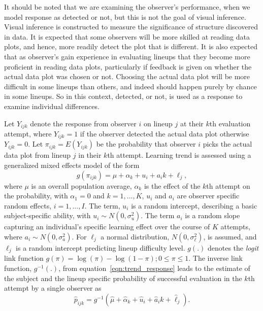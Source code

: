 \documentclass[10pt]{article}\usepackage[]{graphicx}\usepackage[]{color}
\begin{document}
It should be noted that we are examining the observer's performance, when we model response as detected or not, but this is not the goal of visual inference. Visual inference is constructed to measure the significance of structure discovered in data. It is expected that some observers will be more skilled at reading data plots, and hence, more readily detect the plot that is different. It is also expected that as observer's gain experience in evaluating lineups that they become more proficient in reading data plots, particularly if feedback is given on whether the actual data plot was chosen or not. Choosing the actual data plot will be more difficult in some lineups than others, and indeed should happen purely by chance in some lineups.%
So in this context, detected, or not, is used as a response to examine individual differences. 


Let $Y_{ijk}$ denote the response from observer $i$ on lineup $j$ at their $k$th evaluation attempt, where $Y_{ijk}=1$ if the observer detected the actual data plot otherwise  $Y_{ijk}=0$. Let $\pi_{ijk}=  E(Y_{ijk})$ be the probability that  observer $i$ picks the actual data plot from lineup $j$ in their $k$th attempt. Learning trend is assessed using a generalized mixed effects model of the form
\begin{equation} \label{eqn:trend_response}
g( \pi_{ijk} )= \mu + \alpha_k + u_i +  a_{i} k + \ell_j,  
\end{equation}
where $\mu$ is an overall population average, %
$\alpha_k$ is the effect of the $k$th attempt on the probability, with $\alpha_1 = 0$ and $k = 1, ..., K$, $u_i$ and $a_i$ are observer specific random effects, $i = 1, ..., I$. The term, $u_i$ is a random intercept, describing a basic subject-specific ability, with $u_i \sim N(0, \sigma_u^2)$. 
The term $a_i$ is a random slope capturing an individual's specific learning effect over the course of $K$ attempts, where $a_i \sim N(0, \sigma_a^2)$. 
For $\ell_j$ a normal distribution, $N(0, \sigma_\ell^2)$, is assumed, and $\ell_j$ is a random intercept predicting lineup difficulty level. $g(.)$ denotes the {\it logit} link function $g(\pi)=\log(\pi) - \log(1-\pi); 0 \le \pi \le 1$. The inverse link function, $g^{-1}(.)$, from equation~\ref{eqn:trend_response} leads to the estimate of the subject and the lineup specific probability of successful evaluation in the $k$th attempt by a single observer as 
\begin{equation} \label{eqn:trend_power}
\hat p_{ijk} =  g^{-1}(\hat{\mu} + \hat{\alpha}_k + \hat{u}_i +  \hat{a}_i k + \hat{\ell}_j).
\end{equation}
\end{document}
